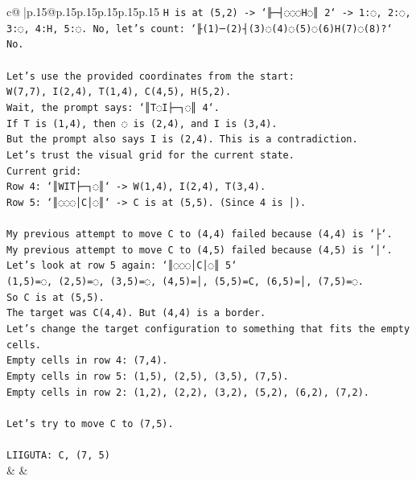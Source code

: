 \documentclass{article}
\begin{document}
{\begin{supertabular}{c@{$\;$}|p{.15\linewidth}@{}p{.15\linewidth}p{.15\linewidth}p{.15\linewidth}p{.15\linewidth}p{.15\linewidth}}
{{{\texttt{H is at (5,2) {-}> `╟─┤◌◌◌H◌║ 2` {-}> 1:◌, 2:◌, 3:◌, 4:H, 5:◌. No, let's count: `╟(1)─(2)┤(3)◌(4)◌(5)◌(6)H(7)◌(8)?` No.} \\
\\ 
\texttt{Let's use the provided coordinates from the start:} \\
\texttt{W(7,7), I(2,4), T(1,4), C(4,5), H(5,2).} \\
\texttt{Wait, the prompt says: `║T◌I├─┐◌║ 4`.} \\
\texttt{If T is (1,4), then ◌ is (2,4), and I is (3,4).} \\
\texttt{But the prompt also says I is (2,4). This is a contradiction.} \\
\texttt{Let's trust the visual grid for the current state.} \\
\texttt{Current grid:} \\
\texttt{Row 4: `║WIT├─┐◌║` {-}> W(1,4), I(2,4), T(3,4).} \\
\texttt{Row 5: `║◌◌◌│C│◌║` {-}> C is at (5,5). (Since 4 is │).} \\
\\ 
\texttt{My previous attempt to move C to (4,4) failed because (4,4) is `├`.} \\
\texttt{My previous attempt to move C to (4,5) failed because (4,5) is `│`.} \\
\texttt{Let's look at row 5 again: `║◌◌◌│C│◌║ 5`} \\
\texttt{(1,5)=◌, (2,5)=◌, (3,5)=◌, (4,5)=│, (5,5)=C, (6,5)=│, (7,5)=◌.} \\
\texttt{So C is at (5,5).} \\
\texttt{The target was C(4,4). But (4,4) is a border.} \\
\texttt{Let's change the target configuration to something that fits the empty cells.} \\
\texttt{Empty cells in row 4: (7,4).} \\
\texttt{Empty cells in row 5: (1,5), (2,5), (3,5), (7,5).} \\
\texttt{Empty cells in row 2: (1,2), (2,2), (3,2), (5,2), (6,2), (7,2).} \\
\\ 
\texttt{Let's try to move C to (7,5).} \\
\\ 
\texttt{LIIGUTA: C, (7, 5)} \\
            }
        }
    }
    & & \\ \\


\end{supertabular}}
\end{document}
